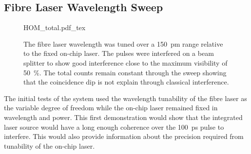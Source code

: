 

\subsection{Fibre Laser Wavelength Sweep}

\begin{figure}[tp]
	\centering
	\small
	\def\svgwidth{0.7\textwidth} 
	{HOM_total.pdf_tex}
	\caption[HOM interference between fibre components and chip]{The fibre laser wavelength was tuned over a \SI{150}{pm} range relative to the fixed on-chip laser. The pulses were interfered on a beam splitter to show good interference close to the maximum visibility of \SI{50}{\percent}. The total counts remain constant through the sweep showing that the coincidence dip is not explain through classical interference.}
	\label{fig:fibre_wavelength_sweep}
\end{figure}




The initial tests of the system used the wavelength tunability of the fibre laser as the variable degree of freedom while the on-chip laser remained fixed in wavelength and power. This first demonstration would show that the integrated laser source would have a long enough coherence over the \SI{100}{ps} pulse to interfere. This would also provide information about the precision required from tunability of the on-chip laser. 

